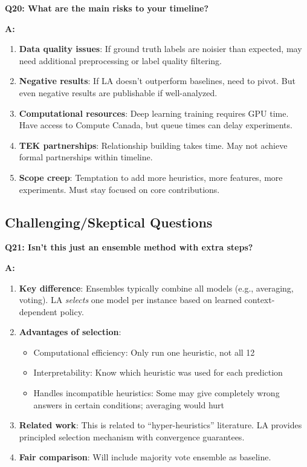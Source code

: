 \documentclass[11pt]{article}
\begin{document}
\textbf{Q20: What are the main risks to your timeline?}

\textbf{A:}

\begin{enumerate}
    \item \textbf{Data quality issues}: If ground truth labels are noisier than expected, may need additional preprocessing or label quality filtering.

    \item \textbf{Negative results}: If LA doesn't outperform baselines, need to pivot. But even negative results are publishable if well-analyzed.

    \item \textbf{Computational resources}: Deep learning training requires GPU time. Have access to Compute Canada, but queue times can delay experiments.

    \item \textbf{TEK partnerships}: Relationship building takes time. May not achieve formal partnerships within timeline.

    \item \textbf{Scope creep}: Temptation to add more heuristics, more features, more experiments. Must stay focused on core contributions.
\end{enumerate}

\subsection{Challenging/Skeptical Questions}

\textbf{Q21: Isn't this just an ensemble method with extra steps?}

\textbf{A:}

\begin{enumerate}
    \item \textbf{Key difference}: Ensembles typically combine all models (e.g., averaging, voting). LA \textit{selects} one model per instance based on learned context-dependent policy.

    \item \textbf{Advantages of selection}:
    \begin{itemize}
        \item Computational efficiency: Only run one heuristic, not all 12
        \item Interpretability: Know which heuristic was used for each prediction
        \item Handles incompatible heuristics: Some may give completely wrong answers in certain conditions; averaging would hurt
    \end{itemize}

    \item \textbf{Related work}: This is related to ``hyper-heuristics'' literature. LA provides principled selection mechanism with convergence guarantees.

    \item \textbf{Fair comparison}: Will include majority vote ensemble as baseline.
\end{enumerate}
\end{document}

